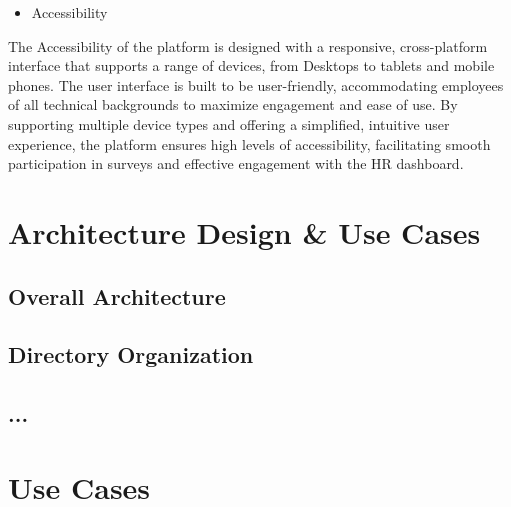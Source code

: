 \documentclass[conference]{IEEEtran}
\begin{document}
        \begin{itemize}
            \item Accessibility
        \end{itemize}

        The Accessibility of the platform is designed with a responsive, 
        cross-platform interface that supports a range of devices, from 
        Desktops to tablets and mobile phones. The user interface is built 
        to be user-friendly, accommodating employees of all technical 
        backgrounds to maximize engagement and ease of use. By supporting 
        multiple device types and offering a simplified, intuitive user 
        experience, the platform ensures high levels of accessibility, 
        facilitating smooth participation in surveys and effective 
        engagement with the HR dashboard. 
        \newline 

    \section{Architecture Design \& Use Cases}

        \subsection{Overall Architecture}

        \subsection{Directory Organization}

        \subsection{...}
            
    \section{Use Cases}
\end{document}
